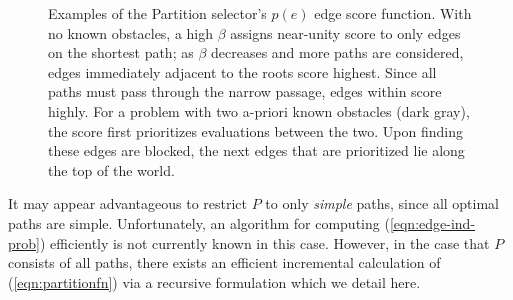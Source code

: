 \begin{figure}
   \centering
   
   

   \caption{Examples of the Partition selector's
      $p(e)$ edge score function.
      With no known obstacles,
      a high $\beta$ assigns near-unity score to only edges on the
      shortest path;
      as $\beta$ decreases and more paths are considered,
      edges immediately adjacent to the roots score highest.
      Since all paths must pass
      through the narrow passage,
      edges within score highly.
      For a problem with two a-priori known obstacles (dark gray),
      the score first prioritizes evaluations between the two.
      Upon finding these edges are blocked,
      the next edges that are prioritized lie along the top of the world.}
   \label{ref:example-scores}
\end{figure}

It may appear advantageous to restrict $P$ to only
\emph{simple} paths,
since all optimal paths are simple.
Unfortunately,
an algorithm for computing (\ref{eqn:edge-ind-prob}) efficiently is not
currently known in this case.
However,
in the case that $P$ consists of all paths,
there exists an efficient incremental calculation of
(\ref{eqn:partitionfn}) via a recursive formulation
which we detail here.

